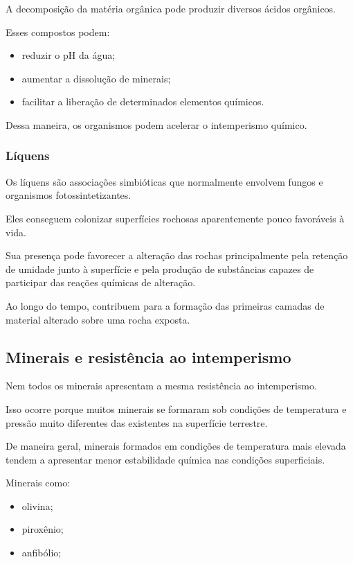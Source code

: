 \documentclass[a4paper,12pt]{article}
\theoremstyle{definition}
\theoremstyle{definition}
\theoremstyle{definition}
\begin{document}
A decomposição da matéria orgânica pode produzir diversos ácidos orgânicos.

Esses compostos podem:

\begin{itemize}
    \item reduzir o pH da água;
    \item aumentar a dissolução de minerais;
    \item facilitar a liberação de determinados elementos químicos.
\end{itemize}

Dessa maneira, os organismos podem acelerar o intemperismo químico.

\subsubsection{Líquens}

Os líquens são associações simbióticas que normalmente envolvem fungos e organismos fotossintetizantes.

Eles conseguem colonizar superfícies rochosas aparentemente pouco favoráveis à vida.

Sua presença pode favorecer a alteração das rochas principalmente pela retenção de umidade junto à superfície e pela produção de substâncias capazes de participar das reações químicas de alteração.

Ao longo do tempo, contribuem para a formação das primeiras camadas de material alterado sobre uma rocha exposta.

\subsection{Minerais e resistência ao intemperismo}

Nem todos os minerais apresentam a mesma resistência ao intemperismo.

Isso ocorre porque muitos minerais se formaram sob condições de temperatura e pressão muito diferentes das existentes na superfície terrestre.

De maneira geral, minerais formados em condições de temperatura mais elevada tendem a apresentar menor estabilidade química nas condições superficiais.

Minerais como:

\begin{itemize}
    \item olivina;
    \item piroxênio;
    \item anfibólio;
\end{itemize}
\end{document}
